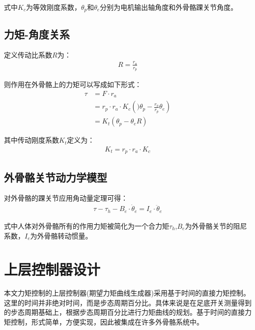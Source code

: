 式中$K_c$为等效刚度系数，$\theta_p$和$\theta_e$分别为电机输出轴角度和外骨骼踝关节角度。

\subsection{力矩-角度关系}

定义传动比系数$R$为：
\begin{align}
    R = \frac{r_a}{r_p}
\end{align}

则作用在外骨骼上的力矩可以写成如下形式：
\begin{align}
\tau &=F \cdot r_{a} \\ &=r_{p} \cdot r_{a} \cdot K_{c}\left()\theta_{p}-\frac{r_{a}}{r_{p}} \theta_{e}\right) \\ &=K_{t}\left(\theta_{p}-\theta_{e} R\right) 
\end{align}

其中传动刚度系数$K_t$定义为：
\begin{align}
    K_t = r_p\cdot r_a \cdot K_c
\end{align}

\subsection{外骨骼关节动力学模型}

对外骨骼的踝关节应用角动量定理可得：
\begin{align}
    \tau-\tau_{h}-B_{e} \cdot \dot{\theta}_{e}=I_{e} \cdot \ddot{\theta}_{e}
\end{align}

式中人体对外骨骼所有的作用力矩被简化为一个合力矩$\tau_h$,$B_e$为外骨骼关节的阻尼系数，$I_e$为外骨骼转动惯量。

\section{上层控制器设计}

本文力矩控制的上层控制器(期望力矩曲线生成器)采用基于时间的直接力矩控制。这里的时间并非绝对时间，而是步态周期百分比。具体来说是在足底开关测量得到的步态周期基础上，根据步态周期百分比进行力矩曲线的规划。基于时间的直接力矩控制，形式简单，方便实现，因此被集成在许多外骨骼系统中。

